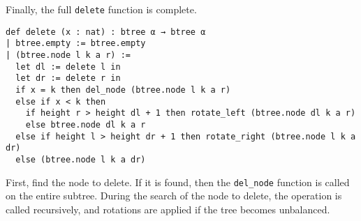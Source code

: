 Finally, the full \lstinline{delete} function is complete. 

\begin{lstlisting}
def delete (x : nat) : btree α → btree α
| btree.empty := btree.empty
| (btree.node l k a r) :=
  let dl := delete l in
  let dr := delete r in
  if x = k then del_node (btree.node l k a r)
  else if x < k then
    if height r > height dl + 1 then rotate_left (btree.node dl k a r)
    else btree.node dl k a r
  else if height l > height dr + 1 then rotate_right (btree.node l k a dr)
  else (btree.node l k a dr)
\end{lstlisting}

First, find the node to delete. If it is found, then the \lstinline{del_node} function is called on the entire subtree. During the search of the node to delete, the operation is called recursively, and rotations are applied if the tree becomes unbalanced. 